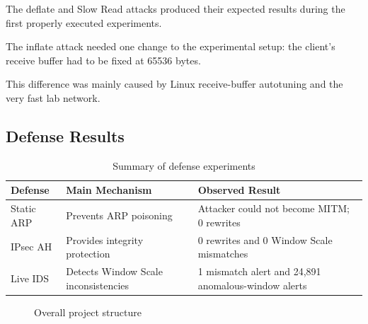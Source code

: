 \documentclass[11pt]{article}
\begin{document}
The deflate and Slow Read attacks produced their expected results
during the first properly executed experiments.

The inflate attack needed one change to the experimental setup:
the client's receive buffer had to be fixed at 65536 bytes.

This difference was mainly caused by Linux receive-buffer autotuning
and the very fast lab network.

\subsection{Defense Results}

\begin{table}[h]
\centering
\begin{tabular}{p{3cm}p{4.2cm}p{4.3cm}}
\toprule
Defense & Main Mechanism & Observed Result \\
\midrule
Static ARP
&
Prevents ARP poisoning
&
Attacker could not become MITM; 0 rewrites
\\

IPsec AH
&
Provides integrity protection
&
0 rewrites and 0 Window Scale mismatches
\\

Live IDS
&
Detects Window Scale inconsistencies
&
1 mismatch alert and 24,891 anomalous-window alerts
\\
\bottomrule
\end{tabular}
\caption{Summary of defense experiments}
\end{table}

\begin{figure}[h]
\centering
{}
\caption{Overall project structure}
\end{figure}
\end{document}

